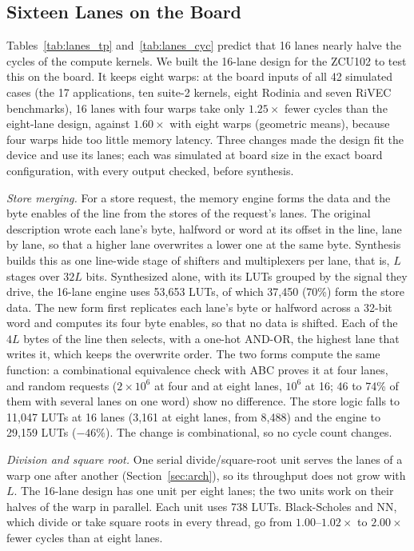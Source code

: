 \documentclass[journal]{IEEEtran}
\begin{document}
\subsection{Sixteen Lanes on the Board}\label{sec:lanes16}
Tables~\ref{tab:lanes_tp} and~\ref{tab:lanes_cyc} predict that 16 lanes nearly halve
the cycles of the compute kernels. We built the 16-lane design for the ZCU102 to test
this on the board. It keeps eight warps: at the board inputs of all 42 simulated
cases (the 17 applications, ten suite-2 kernels, eight Rodinia and seven RiVEC
benchmarks), 16 lanes with four warps take only $1.25\times$ fewer cycles than the
eight-lane design, against $1.60\times$ with eight warps (geometric means), because
four warps hide too little memory latency. Three changes made the design fit the
device and use its lanes; each was simulated at board size in the exact board
configuration, with every output checked, before synthesis.

\emph{Store merging.} For a store request, the memory engine forms the data and the
byte enables of the line from the stores of the request's lanes. The original
description wrote each lane's byte, halfword or word at its offset in the line, lane
by lane, so that a higher lane overwrites a lower one at the same byte. Synthesis
builds this as one line-wide stage of shifters and multiplexers per lane, that is,
$L$ stages over $32L$ bits. Synthesized alone, with its LUTs grouped by the signal
they drive, the 16-lane engine uses 53,653 LUTs, of which 37,450 (70\%) form the
store data. The new form first replicates each lane's byte or halfword across a
32-bit word and computes its four byte enables, so that no data is shifted. Each of
the $4L$ bytes of the line then selects, with a one-hot AND-OR, the highest lane that
writes it, which keeps the overwrite order. The two forms compute the same function:
a combinational equivalence check with ABC proves it at four lanes, and random
requests ($2\times10^6$ at four and at eight lanes, $10^6$ at 16; 46 to 74\% of them
with several lanes on one word) show no difference. The store logic falls to 11,047 LUTs at 16 lanes
(3,161 at eight lanes, from 8,488) and the engine to 29,159 LUTs ($-46\%$). The
change is combinational, so no cycle count changes.

\emph{Division and square root.} One serial divide/square-root unit serves the
lanes of a warp one after another (Section~\ref{sec:arch}), so its throughput does
not grow with $L$. The 16-lane design has one unit per eight lanes; the two units
work on their halves of the warp in parallel. Each unit uses 738 LUTs. Black-Scholes
and NN, which divide or take square roots in every thread, go from $1.00$--$1.02\times$
to $2.00\times$ fewer cycles than at eight lanes.
\end{document}
